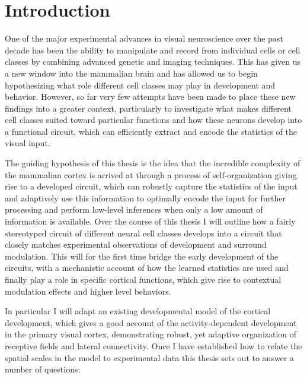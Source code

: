 \chapter{Introduction}

One of the major experimental advances in visual neuroscience over the
past decade has been the ability to manipulate and record from
individual cells or cell classes by combining advanced genetic and
imaging techniques. This has given us a new window into the mammalian
brain and has allowed us to begin hypothesizing what role different
cell classes may play in development and behavior. However, so far
very few attempts have been made to place these new findings into a
greater context, particularly to investigate what makes different cell
classes suited toward particular functions and how these neurons
develop into a functional circuit, which can efficiently extract and
encode the statistics of the visual input.

The guiding hypothesis of this thesis is the idea that the incredible
complexity of the mammalian cortex is arrived at through a process of
self-organization giving rise to a developed circuit, which can
robustly capture the statistics of the input and adaptively use this
information to optimally encode the input for further processing and
perform low-level inferences when only a low amount of information is
available. Over the course of this thesis I will outline how a fairly
stereotyped circuit of different neural cell classes develops into a
circuit that closely matches experimental observations of development
and surround modulation. This will for the first time bridge the early
development of the circuits, with a mechanistic account of how the
learned statistics are used and finally play a role in specific
cortical functions, which give rise to contextual modulation effects
and higher level behaviors.

In particular I will adapt an existing developmental model of the
cortical development, which gives a good account of the
activity-dependent development in the primary visual cortex,
demonstrating robust, yet adaptive organization of receptive fields
and lateral connectivity. Once I have established how to relate the
spatial scales in the model to experimental data this thesis sets out
to answer a number of questions:

